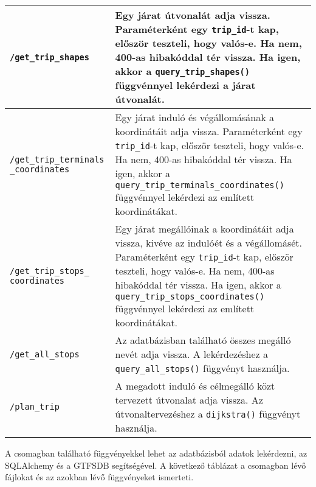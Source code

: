 \begin{longtable}{|p{4.5cm}|p{9cm}|}
\hline
\texttt{/get\_trip\_shapes} &
Egy járat útvonalát adja vissza. Paraméterként egy \texttt{trip\_id}-t kap, először teszteli, hogy valós-e. Ha nem, 400-as hibakóddal tér vissza. Ha igen, akkor a \texttt{query\_trip\_shapes()} függvénnyel lekérdezi a járat útvonalát. \\
\hline
\texttt{/get\_trip\_terminals} \texttt{\_coordinates} &
Egy járat induló és végállomásának a koordinátáit adja vissza. Paraméterként egy \texttt{trip\_id}-t kap, először teszteli, hogy valós-e. Ha nem, 400-as hibakóddal tér vissza. Ha igen, akkor a \texttt{query\_trip\_terminals\_coordinates()} függvénnyel lekérdezi az említett koordinátákat. \\
\hline
\texttt{/get\_trip\_stops\_} \texttt{coordinates} &
Egy járat megállóinak a koordinátáit adja vissza, kivéve az indulóét és a végállomásét. Paraméterként egy \texttt{trip\_id}-t kap, először teszteli, hogy valós-e. Ha nem, 400-as hibakóddal tér vissza. Ha igen, akkor a \texttt{query\_trip\_stops\_coordinates()} függvénnyel lekérdezi az említett koordinátákat. \\
\hline
\texttt{/get\_all\_stops} &
Az adatbázisban található összes megálló nevét adja vissza. A lekérdezéshez a \texttt{query\_all\_stops()} függvényt használja. \\
\hline
\texttt{/plan\_trip} &
A megadott induló és célmegálló közt tervezett útvonalat adja vissza. Az útvonaltervezéshez a \texttt{dijkstra()} függvényt használja. \\
\hline
\end{longtable}


A csomagban található függvényekkel lehet az adatbázisból adatok lekérdezni, az SQLAlchemy és a GTFSDB segítségével. A következő táblázat a csomagban lévő fájlokat és az azokban lévő függvényeket ismerteti.

